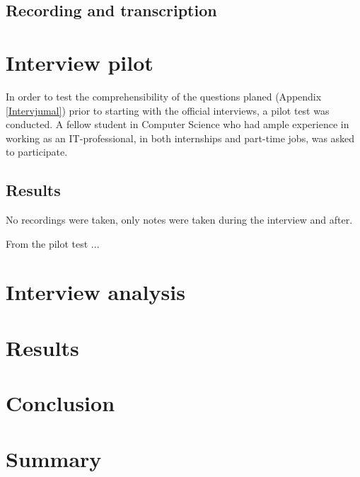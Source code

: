 
\subsection{Recording and transcription}

\section{Interview pilot}
In order to test the comprehensibility of the questions planed (Appendix \ref{Intervjumal}) prior to starting with the official interviews, a pilot test was conducted. A fellow student in Computer Science who had ample experience in working as an IT-professional, in both internships and part-time jobs, was asked to participate. 

\subsection{Results}
No recordings were taken, only notes were taken during the interview and after.

From the pilot test ...

\section{Interview analysis}

\section{Results}

\section{Conclusion}
\section{Summary}